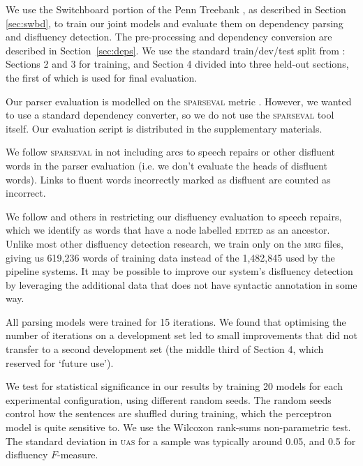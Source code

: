 \documentclass[11pt,letterpaper]{article}
\newcommand{\sparseval}{\textsc{sparseval}\xspace}
\begin{document}
We use the Switchboard portion of the Penn Treebank \citep{marcus:93}, as
described in Section \ref{sec:swbd}, to train our joint
models and evaluate them on dependency parsing and disfluency detection. The
pre-processing and dependency conversion are described in Section~\ref{sec:deps}.
We use the standard train/dev/test split from \citet{Charniak01a}: Sections 2
and 3 for training, and Section 4 divided into three held-out sections, the first
of which is used for final evaluation.

Our parser evaluation is modelled on the \sparseval metric \citep{sparseval}.
However, we wanted to use a standard dependency converter, so we
do not use the \sparseval tool itself.  Our evaluation script is distributed
in the supplementary materials.

We follow \sparseval in not including arcs to speech repairs or other disfluent
words in the parser evaluation (i.e. we don't evaluate the heads of disfluent
words).  Links to fluent words incorrectly marked as disfluent are counted as
incorrect.  

We follow \citet{Johnson04a} and others in restricting our disfluency evaluation
to speech repairs, which we identify as words that have a node labelled \textsc{edited}
as an ancestor.  Unlike most other disfluency detection research, we train only
on the \textsc{mrg} files, giving us 619,236 words of training data instead of
the 1,482,845 used by the pipeline systems.  It may be possible to improve our
system's disfluency detection by leveraging the additional data that does not
have syntactic annotation in some way.

All parsing models were trained for 15 iterations.
We found that optimising the number of iterations on a development set led to
small improvements that did not transfer to a second development set (the middle
third of Section 4, which \citet{Charniak01a} reserved for `future use').

We test for statistical significance in our results by training 20 models for
each experimental configuration, using different random seeds. The random seeds
control how the sentences are shuffled during training, which the perceptron
model is quite sensitive to.  We use the Wilcoxon rank-sums non-parametric test.
The standard deviation in \textsc{uas} for a sample was typically around 0.05,
and 0.5 for disfluency $F$-measure.
\end{document}
